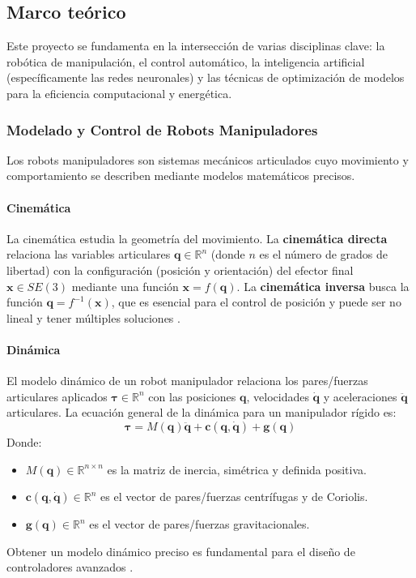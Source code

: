 \documentclass[12pt]{article}
\begin{document}
\subsection{Marco teórico}
Este proyecto se fundamenta en la intersección de varias disciplinas clave: la robótica de manipulación, el control automático, la inteligencia artificial (específicamente las redes neuronales) y las técnicas de optimización de modelos para la eficiencia computacional y energética.

\subsubsection{Modelado y Control de Robots Manipuladores}
\label{ssec:modelado_control_robots}

Los robots manipuladores son sistemas mecánicos articulados cuyo movimiento y comportamiento se describen mediante modelos matemáticos precisos.

\paragraph{Cinemática}
\label{sssec:cinematica_robots}
La cinemática estudia la geometría del movimiento. La \textbf{cinemática directa} relaciona las variables articulares $\bm{q} \in \mathbb{R}^n$ (donde $n$ es el número de grados de libertad) con la configuración (posición y orientación) del efector final $\bm{x} \in SE(3)$ mediante una función $\bm{x} = f(\bm{q})$. La \textbf{cinemática inversa} busca la función $\bm{q} = f^{-1}(\bm{x})$, que es esencial para el control de posición y puede ser no lineal y tener múltiples soluciones \cite{modern_robotics}.

\paragraph{Dinámica}
\label{sssec:dinamica_robots}
El modelo dinámico de un robot manipulador relaciona los pares/fuerzas articulares aplicados $\bm{\tau} \in \mathbb{R}^n$ con las posiciones $\bm{q}$, velocidades $\dot{\bm{q}}$ y aceleraciones $\ddot{\bm{q}}$ articulares. La ecuación general de la dinámica para un manipulador rígido es:
\begin{equation}
\bm{\tau} = M(\bm{q})\ddot{\bm{q}} + \bm{c}(\bm{q},\dot{\bm{q}}) + \bm{g}(\bm{q})
\label{eq:dinamica_robot}
\end{equation}
Donde:
\begin{itemize}
    \item $M(\bm{q}) \in \mathbb{R}^{n \times n}$ es la matriz de inercia, simétrica y definida positiva.
    \item $\bm{c}(\bm{q},\dot{\bm{q}}) \in \mathbb{R}^n$ es el vector de pares/fuerzas centrífugas y de Coriolis.
    \item $\bm{g}(\bm{q}) \in \mathbb{R}^n$ es el vector de pares/fuerzas gravitacionales.
\end{itemize}
Obtener un modelo dinámico preciso es fundamental para el diseño de controladores avanzados \cite{modern_robotics}.
\end{document}

